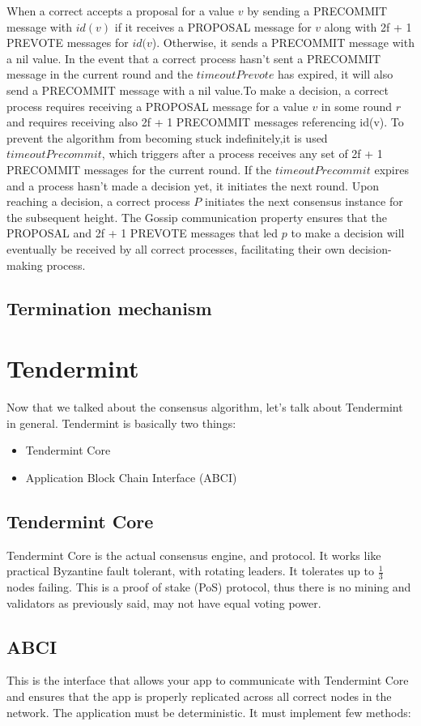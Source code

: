 \documentclass{article}
\begin{document}
	When a correct accepts a proposal for a value $v$ by sending a PRECOMMIT message with $id(v)$ if it receives a PROPOSAL message for $v$ along with 2f + 1 PREVOTE messages for $id(v$). Otherwise, it sends a PRECOMMIT message with a nil value. In the event that a correct process hasn't sent a PRECOMMIT message in the current round and the $timeoutPrevote$ has expired, it will also send a PRECOMMIT message with a nil value.To make a decision, a correct process requires receiving a PROPOSAL message for a value $v$ in some round $r$ and requires receiving also 2f + 1 PRECOMMIT messages referencing id(v). To prevent the algorithm from becoming stuck indefinitely,it is used $timeoutPrecommit$, which triggers after a process receives any set of 2f + 1 PRECOMMIT messages for the current round. If the $timeoutPrecommit$ expires and a process hasn't made a decision yet, it initiates the next round. Upon reaching a decision, a correct process $P$ initiates the next consensus instance for the subsequent height. The Gossip communication property ensures that the PROPOSAL and 2f + 1 PREVOTE messages that led $p$ to make a decision will eventually be received by all correct processes, facilitating their own decision-making process.
	\subsection{Termination mechanism}
	\newpage
	\section{Tendermint}
	Now that we talked about the consensus algorithm, let's talk about Tendermint in general. Tendermint is basically two things:
	\begin{itemize}
	 	\item Tendermint Core
	 	\item Application Block Chain Interface (ABCI)
	\end{itemize}
	\subsection{Tendermint Core}
	Tendermint Core is the actual consensus engine, and protocol. It works like practical Byzantine fault tolerant, with rotating leaders. It tolerates up to $\frac{1}{3}$ nodes failing. This is a proof of stake (PoS) protocol, thus there is no mining and validators as previously said, may not have equal voting power.
	\subsection{ABCI}
	This is the interface that allows your app to communicate with Tendermint Core and ensures that the app is properly replicated across all correct nodes in the network. The application must be deterministic. It must implement few methods:
\end{document}
